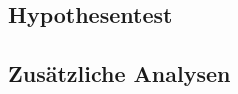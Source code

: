 \subsection{Hypothesentest} \label{sec:Hypothesentest}

\subsection{Zusätzliche Analysen} \label{sec:ZusätzlicheAnalysen}